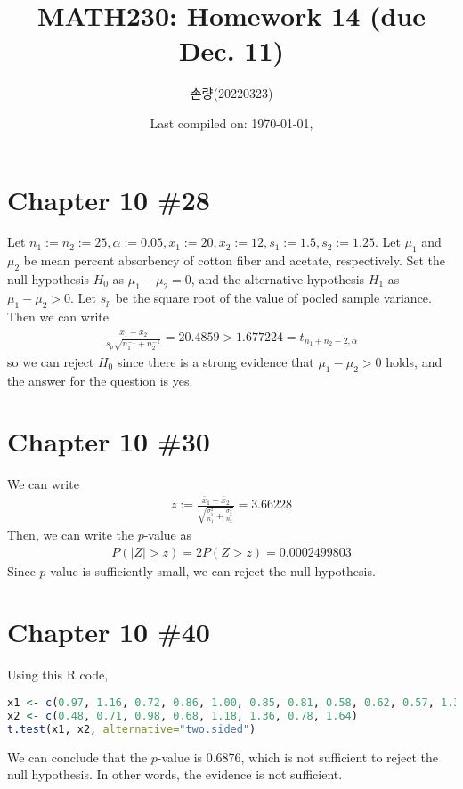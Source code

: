 \documentclass{scrartcl}
\title{MATH230: Homework 14 (due Dec. 11)}
\author{손량(20220323)}
\date{Last compiled on: \today, \currenttime}
\begin{document}
\maketitle

\section{Chapter 10 \#28}
Let \(n_1 := n_2 := 25, \alpha := 0.05, \bar{x}_1 := 20, \bar{x}_2 := 12, s_1
:= 1.5, s_2 := 1.25\). Let \(\mu_1\) and \(\mu_2\) be mean percent absorbency
of cotton fiber and acetate, respectively. Set the null hypothesis \(H_0\) as
\(\mu_1 - \mu_2 = 0\), and the alternative hypothesis \(H_1\) as \(\mu_1 - \mu_2
> 0\). Let \(s_p\) be the square root of the value of pooled sample variance.
Then we can write
\begin{align*}
  \frac{\bar{x}_1 - \bar{x}_2}{s_p \sqrt{n^{-1}_1 + n^{-1}_2}}
  = 20.4859
  > 1.677224
  = t_{n_1 + n_2 - 2, \alpha}
\end{align*}
so we can reject \(H_0\) since there is a strong evidence that \(\mu_1 - \mu_2
> 0\) holds, and the answer for the question is yes.

\section{Chapter 10 \#30}
We can write
\begin{align*}
  z
  := \frac{\bar{x}_1 - \bar{x}_2}
    {\sqrt{\frac{\sigma^2_1}{n_1} + \frac{\sigma^2_2}{n_2}}}
  = 3.66228
\end{align*}
Then, we can write the \(p\)-value as
\begin{align*}
  P(|Z| > z)
  = 2P(Z > z)
  = 0.0002499803
\end{align*}
Since \(p\)-value is sufficiently small, we can reject the null hypothesis.

\section{Chapter 10 \#40}
Using this R code,
\begin{lstlisting}[language=R]
x1 <- c(0.97, 1.16, 0.72, 0.86, 1.00, 0.85, 0.81, 0.58, 0.62, 0.57, 1.32, 0.64, 1.24, 0.98, 0.99, 1.09, 0.90, 0.92, 0.74, 0.78, 0.88, 1.24, 0.94, 1.18)
x2 <- c(0.48, 0.71, 0.98, 0.68, 1.18, 1.36, 0.78, 1.64)
t.test(x1, x2, alternative="two.sided")
\end{lstlisting}
We can conclude that the \(p\)-value is 0.6876, which is not sufficient to
reject the null hypothesis. In other words, the evidence is not sufficient.
\end{document}
